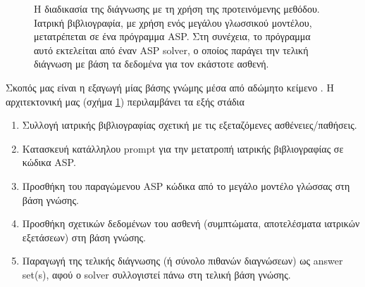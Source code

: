 \documentclass[12pt]{extarticle}
\begin{document}
\begin{figure}[!h]
\begin{center}
\end{center}
    \caption{Η διαδικασία της διάγνωσης με τη χρήση της προτεινόμενης μεθόδου.
    Ιατρική βιβλιογραφία, με χρήση ενός μεγάλου γλωσσικού μοντέλου, μετατρέπεται σε ένα πρόγραμμα ASP.
    Στη συνέχεια, το πρόγραμμα αυτό εκτελείται από έναν ASP solver, ο οποίος παράγει την τελική διάγνωση
    με βάση τα δεδομένα για τον εκάστοτε ασθενή.}
    \label{fig:architecture}
\end{figure}

Σκοπός μας είναι η εξαγωγή μίας βάσης γνώμης μέσα από αδώμητο κείμενο \cite{ré2014feature}.
Η αρχιτεκτονική μας (σχήμα \ref{fig:architecture}) περιλαμβάνει τα εξής στάδια

\begin{enumerate}
    \item Συλλογή ιατρικής βιβλιογραφίας σχετική με τις εξεταζόμενες ασθένειες/παθήσεις.
    \item Κατασκευή κατάλληλου prompt για την μετατροπή ιατρικής βιβλιογραφίας σε κώδικα ASP.
    \item Προσθήκη του παραγώμενου ASP κώδικα από το μεγάλο μοντέλο γλώσσας στη βάση γνώσης.
    \item Προσθήκη σχετικών δεδομένων του ασθενή (συμπτώματα, αποτελέσματα ιατρικών εξετάσεων) στη βάση γνώσης.
    \item Παραγωγή της τελικής διάγνωσης (ή σύνολο πιθανών διαγνώσεων) ως answer set(s), αφού ο solver συλλογιστεί 
          πάνω στη τελική βάση γνώσης.
\end{enumerate}
\end{document}
